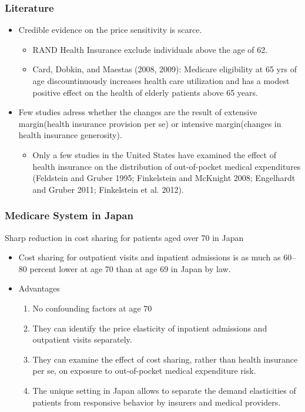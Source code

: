 \documentclass[dvipdfmx,11pt]{beamer}
\begin{document}
\begin{frame}\frametitle{Literature}
  \begin{itemize}
    \item Credible evidence on the price sensitivity is scarce.
    \begin{itemize}
      \item RAND Health Insurance exclude individuals above the age of 62.
      \item Card, Dobkin, and Maestas (2008, 2009): Medicare eligibility at 65 yrs of age discountinuously increases health care utilization and has a modest positive effect on the health of elderly patients above 65 years.
    \end{itemize}
    \item Few studies adress whether the changes are the result of extensive margin(health insurance provision per se) or intensive margin(changes in health insurance generosity).
    \begin{itemize}
      \item Only a few studies in the United States have examined the effect of health insurance on the distribution of out-of-pocket medical expenditures (Feldstein and Gruber 1995; Finkelstein and McKnight 2008; Engelhardt and Gruber 2011; Finkelstein et al. 2012).
    \end{itemize}
  \end{itemize}
\end{frame}

\begin{frame}\frametitle{Medicare System in Japan}
  Sharp reduction in cost sharing for patients aged over 70 in Japan
  \begin{itemize}
    \item Cost sharing for outpatient visits and inpatient admissions is as much as 60–80 percent lower at age 70 than at age 69 in Japan by law.
    \item Advantages
    \begin{enumerate}
      \item No confounding factors at age 70
      \item They can identify the price elasticity of inpatient admissions and outpatient visits separately.
      \item They can examine the effect of cost sharing, rather than health insurance per se, on exposure to out-of-pocket medical expenditure risk.
      \item The unique setting in Japan allows to separate the demand elasticities of patients from responsive behavior by insurers and medical providers.
    \end{enumerate}
  \end{itemize}
\end{frame}
\end{document}
